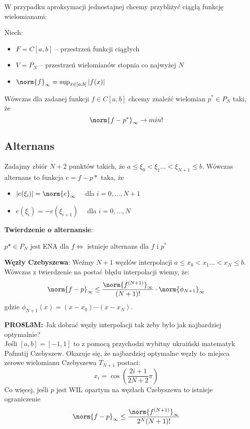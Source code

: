 W przypadku aproksymacji jednostajnej chcemy przybliżyć ciągłą funkcję wielomianami:

Niech:
\begin{itemize}
    \item $F = C[a,b]$ -- przestrzeń funkcji ciągłych

    \item $V = P_N$ -- przestrzeń wielomianów stopnia co najwyżej $N$

    \item $\norm{f}_{\infty} = \sup_{x \in [a,b]} |f(x)|$
\end{itemize}
Wówczas dla zadanej funkcji $f \in C[a,b]$ chcemy znaleźć wielomian $p^* \in P_N$ taki, że
$$
\norm{f-p^*}_{\infty} \to min!
$$

\subsection{Alternans}
Zadajmy zbiór $N+2$ punktów takich, że $a \leq \xi_0 < \xi_1 \ldots < \xi_{N+1} \leq b$. Wówczas alternans to funkcja $e = f - p*$ taka, że
\begin{itemize}
    \item $|e(\xi_i)| = \norm{e}_{\infty} \quad $ dla $i = 0, \ldots, N+1$ 

    \item $e(\xi_i) = -e(\xi_{i+1}) \quad $ dla $i = 0, \ldots, N$ 
\end{itemize}
\textbf{Twierdzenie o alternansie}:

$p* \in P_N$ jest ENA dla $f \iff$ istnieje alternans dla $f$ i $p^*$

\textbf{Węzły Czebyszewa}:
Weźmy $N+1$ węzłów interpolacji $a \leq x_0 < x_1 \ldots < x_{N} \leq b$. Wówczas z twierdzenie na postać błędu interpolacji wiemy, że:
$$
\norm{f-p}_{\infty} \leq \frac{\norm{f^{(N+1)}}_{\infty}}{(N+1)!} \cdot \norm{\phi_{N+1}}_{\infty}
$$
gdzie $\phi_{N+1}(x)=(x-x_0)\cdots(x-x_N)$.

\textbf{PRO8L3M:} Jak dobrać węzły interpolacji tak żeby było jak najbardziej optymalnie?\\

Jeśli $[a,b]=[-1,1]$ to z pomocą przychodzi wybitny ukraiński matematyk Pafnutij Czebyszew. Okazuje się, że najbardziej optymalne węzły to miejsca zerowe wielomianu Czebyszewa $T_{N+1}$ postaci: $$x_i = \cos\left(\frac{2i+1}{2N+2}\pi\right)$$
Co więcej, jeśli $p$ jest WIL opartym na węzłach Czebyszewa to istnieje ograniczenie
$$
\norm{f-p}_{\infty} \leq \frac{\norm{f^{(N+1)}}_{\infty}}{2^N(N+1)!}
$$

